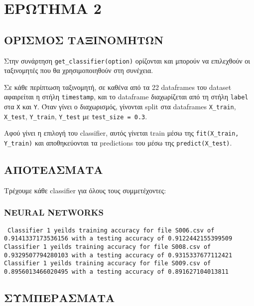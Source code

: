 \chapter{ΕΡΩΤΗΜΑ 2}

    \section{ΟΡΙΣΜΟΣ ΤΑΞΙΝΟΜΗΤΩΝ}

    Στην συνάρτηση \verb|get_classifier(option)| ορίζονται και μπορούν να επιλεχθούν οι ταξινομητές που θα χρησιμοποιηθούν στη συνέχεια.

    Σε κάθε περίπτωση ταξινομητή, σε καθένα από τα 22 dataframes του dataset αφαιρείται η στήλη \texttt{timestamp},
    και το dataframe διαχωρίζεται από τη στήλη \texttt{label} στα \texttt{X} και \texttt{Y}. Όταν γίνει ο διαχωρισμός, γίνονται split
    στα dataframes \texttt{X\_train}, \texttt{X\_test}, \texttt{Y\_train}, \texttt{Y\_test} με \verb|test_size = 0.3|.

    Αφού γίνει η επιλογή του classifier, αυτός γίνεται train μέσω της \verb|fit(X_train, Y_train)| και αποθηκεύονται τα predictions του μέσω της \verb|predict(X_test)|.

    \section{ΑΠΟΤΕΛΣΜΑΤΑ}

        Τρέχουμε κάθε classifier για όλους τους συμμετέχοντες:

    \subsection{NEURAL NETWORKS}
        \begin{graycomment} \tt
            Classifier 1 yeilds training accuracy for file S006.csv of 0.9141337173536156 with a testing accuracy of 0.9122442155399509 \\
            Classifier 1 yeilds training accuracy for file S008.csv of 0.9329507794280103 with a testing accuracy of 0.9315337677112421 \\
            Classifier 1 yeilds training accuracy for file S009.csv of 0.8956013466020495 with a testing accuracy of 0.891627104013811
        \end{graycomment}

    \section{ΣΥΜΠΕΡΑΣΜΑΤΑ}



